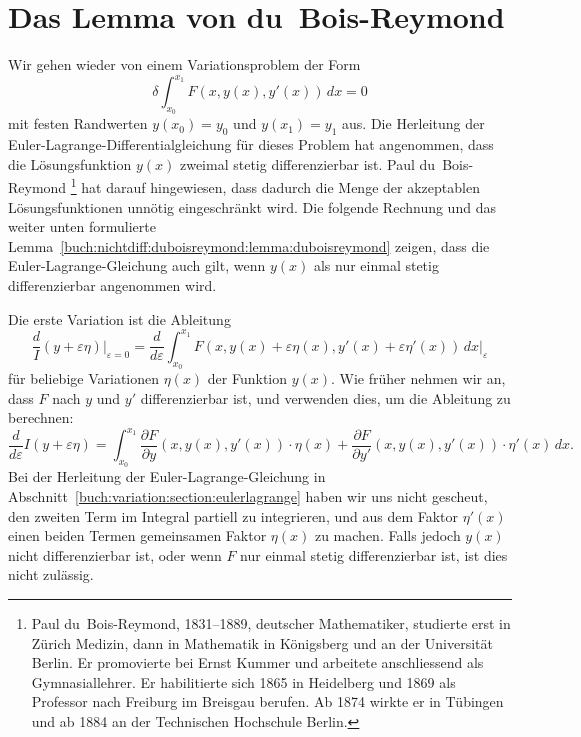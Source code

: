 %
%
%
\section{Das Lemma von du~Bois-Reymond
\label{buch:nichtdiff:section:duboisreymond}}
Wir gehen wieder von einem Variationsproblem der Form
\begin{equation}
\delta
\int_{x_0}^{x_1}
F(x,y(x),y'(x))\,dx
=
0
\label{buch:nichtdiff:duboisreymond:eqn:problem}
\end{equation}
mit festen Randwerten $y(x_0)=y_0$ und $y(x_1)=y_1$ aus.
Die Herleitung der Euler-Lagrange-Differentialgleichung für dieses
Problem hat angenommen, dass die Lösungsfunktion $y(x)$ zweimal
stetig differenzierbar ist.
Paul du~Bois-Reymond%
\footnote{Paul du~Bois-Reymond, 1831--1889, deutscher
Mathematiker, studierte erst in Zürich Medizin, dann in Mathematik
in Königsberg und an der Universität Berlin.
Er promovierte bei Ernst Kummer und arbeitete anschliessend als
Gymnasiallehrer.
Er habilitierte sich 1865 in Heidelberg und 1869 als Professor nach
Freiburg im  Breisgau berufen.
Ab 1874 wirkte er in Tübingen und ab 1884 an der
Technischen Hochschule Berlin.}
hat darauf hingewiesen, dass dadurch die Menge der akzeptablen
Lösungsfunktionen unnötig eingeschränkt wird.
Die folgende Rechnung und das weiter unten formulierte 
Lemma~\ref{buch:nichtdiff:duboisreymond:lemma:duboisreymond}
zeigen, dass die Euler-Lagrange-Gleichung auch gilt, wenn $y(x)$
als nur einmal stetig differenzierbar angenommen wird.

Die erste Variation ist die Ableitung
\[
\frac{d}I(y+\varepsilon\eta)\bigg|_{\varepsilon=0}
=
\frac{d}{d\varepsilon}
\int_{x_0}^{x_1}
F(x,y(x)+\varepsilon\eta(x), y'(x)+\varepsilon\eta'(x))\,dx
\bigg|_{\varepsilon}
\]
für beliebige Variationen $\eta(x)$ der Funktion $y(x)$.
Wie früher nehmen wir an, dass $F$ nach $y$ und $y'$ differenzierbar
ist, und verwenden dies, um die Ableitung zu berechnen:
\begin{equation}
\frac{d}{d\varepsilon}I(y+\varepsilon\eta)
=
\int_{x_0}^{x_1}
\frac{\partial F}{\partial y}(x,y(x),y'(x))\cdot \eta(x)
+
\frac{\partial F}{\partial y'}(x,y(x),y'(x))\cdot \eta'(x)
\,dx.
\label{nichtdiff:duboisreymon:eqn:ableitung}
\end{equation}
Bei der Herleitung der Euler-Lagrange-Gleichung in
Abschnitt~\ref{buch:variation:section:eulerlagrange}
haben wir uns nicht gescheut, den zweiten Term im Integral
partiell zu integrieren, und aus dem Faktor $\eta'(x)$ einen
beiden Termen gemeinsamen Faktor $\eta(x)$ zu machen.
Falls jedoch $y(x)$ nicht differenzierbar ist, oder wenn $F$ nur
einmal stetig differenzierbar ist, ist dies nicht zulässig.

